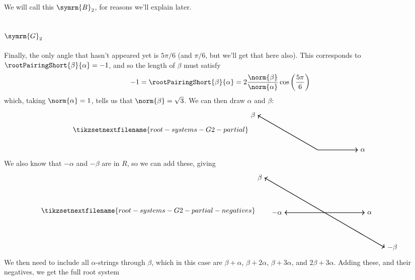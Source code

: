 \documentclass[fleqn]{NotesClass}
\newcommand{\dynkin}[2]{\symrm{#1}_{#2}}
\begin{document}
    We will call this \(\dynkin{B}{2}\), for reasons we'll explain later.
    
    \subsection{\texorpdfstring{\(\dynkin{G}{2}\)}{G2}}
    Finally, the only angle that hasn't appeared yet is \(5\pi/6\) (and \(\pi/6\), but we'll get that here also).
    This corresponds to \(\rootPairingShort{\beta}{\alpha} = -1\), and so the length of \(\beta\) must satisfy
    \begin{equation}
        -1 = \rootPairingShort{\beta}{\alpha} = 2 \frac{\norm{\beta}}{\norm{\alpha}} \cos \left( \frac{5\pi}{6} \right)
    \end{equation}
    which, taking \(\norm{\alpha} = 1\), tells us that \(\norm{\beta} = \sqrt{3}\).
    We can then draw \(\alpha\) and \(\beta\):
    \begin{equation}
        \tikzsetnextfilename{root-systems-G2-partial}
        \begin{tikzpicture}[baseline=(current bounding box)]
            \draw[->, thick] (0, 0) -- (2, 0) node [right] {\(\alpha\)};
            \draw[->, thick] (0, 0) -- (150:{2*sqrt(3)}) node [left] {\(\beta\)};
        \end{tikzpicture}
    \end{equation}
    We also know that \(-\alpha\) and \(-\beta\) are in \(R\), so we can add these, giving
    \begin{equation}
        \tikzsetnextfilename{root-systems-G2-partial-negatives}
        \begin{tikzpicture}[baseline=(current bounding box)]
            \draw[->, thick] (0, 0) -- (2, 0) node [right] {\(\alpha\)};
            \draw[->, thick] (0, 0) -- (150:{2*sqrt(3)}) node [left] {\(\beta\)};
            \draw[->, thick] (0, 0) -- (-2, 0) node [left] {\(-\alpha\)};
            \draw[->, thick] (0, 0) -- (-30:{2*sqrt(3)}) node [right] {\(-\beta\)};
        \end{tikzpicture}
    \end{equation}
    We then need to include all \(\alpha\)-strings through \(\beta\), which in this case are \(\beta + \alpha\), \(\beta + 2\alpha\), \(\beta + 3\alpha\), and \(2\beta + 3\alpha\).
    Adding these, and their negatives, we get the full root system
\end{document}
